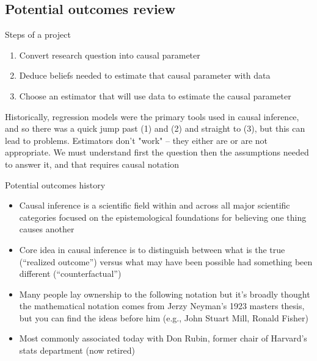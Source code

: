 \documentclass{beamer}
\begin{document}
\subsection{Potential outcomes review}

\begin{frame}{Steps of a project}

\begin{enumerate}
\item Convert research question into causal parameter
\item Deduce beliefs needed to estimate that causal parameter with data
\item Choose an estimator that will use data to estimate the causal parameter
\end{enumerate}

\bigskip

Historically, regression models were the primary tools used in causal inference, and so there was a quick jump past (1) and (2) and straight to (3), but this can lead to problems. Estimators don't "work" -- they either are or are not appropriate. We must understand first the question then the assumptions needed to answer it, and that requires causal notation

\end{frame}


\begin{frame}{Potential outcomes history}

\begin{itemize}

\item Causal inference is a scientific field within and across all major scientific categories focused on the epistemological foundations for believing one thing causes another
\item Core idea in causal inference is to distinguish between what is the true (``realized outcome'') versus what may have been possible had something been different (``counterfactual'')
\item Many people lay ownership to the following notation but it's broadly thought the mathematical notation comes from Jerzy Neyman's 1923 masters thesis, but you can find the ideas before him (e.g., John Stuart Mill, Ronald Fisher)
\item Most commonly associated today with Don Rubin, former chair of Harvard's stats department (now retired)

\end{itemize}

\end{frame}
\end{document}
